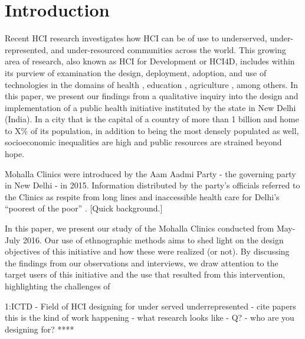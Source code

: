 \section{Introduction}

\begin{comment}
High level overview of the phenomenon you are studying. Should be something the reader can immediately get behind and hook themselves to. 
Now carry the reader through your flow. Draw their focus to the more narrow context in which you did your work.  
“In this paper, we focus on…” Give the high level description of your research.
“This paper is structured as follows.” Give the outline. When you mention the discussion, also mention the main findings of the discussion.
\end{comment}

\textcolor{red}{}

Recent HCI research investigates how HCI can be of use to underserved, under-represented, and under-resourced communities across the world. This growing area of research, also known as HCI for Development or HCI4D, includes within its purview of examination the design, deployment, adoption, and use of technologies in the domains of health \cite{PH-CHI;TP}, education \cite{Kam}, agriculture \cite{Patel}, among others. In this paper, we present our findings from a qualitative inquiry into the design and implementation of a public health initiative instituted by the state in New Delhi (India). In a city that is the capital of a country of more than 1 billion and home to X\% of its population, in addition to being the most densely populated as well, socioeconomic inequalities are high and public resources are strained beyond hope. 

Mohalla Clinics were introduced by the Aam Aadmi Party - the governing party in New Delhi - in 2015. Information distributed by the party's officials referred to the Clinics as respite from long lines and inaccessible health care for Delhi's ``poorest of the poor'' \cite{}. [Quick background.]

In this paper, we present our study of the Mohalla Clinics conducted from May-July 2016. Our use of ethnographic methods aims to shed light on the design objectives of this initiative and how these were realized (or not). By discussing the findings from our observations and interviews, we draw attention to the target users of this initiative and the use that resulted from this intervention, highlighting the challenges of 

1:ICTD - Field of HCI designing for under served underrepresented - cite papers this is the kind of work happening - what research looks like - Q? - who are you designing for?
****

